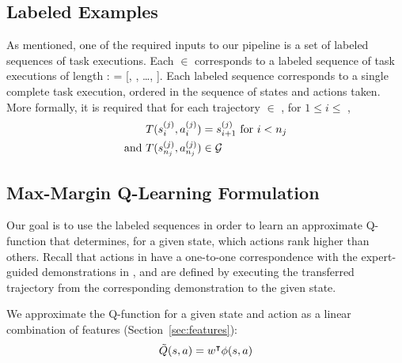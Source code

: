 \subsection{Labeled Examples}
\label{subsec:labeledex}

As mentioned, one of the required inputs to our pipeline is a set 
of labeled sequences of task executions. Each  $\in$ 
corresponds to a labeled sequence of
task executions of length :  = [,
, \ldots, ]. Each labeled sequence corresponds
to a single complete task execution, ordered in the sequence of states and
actions taken. More formally, it is required that for each trajectory
 $\in$ , for $1 \leq i \leq$ ,
\begin{align*}
T(s_{i}^{(j)}, a_{i}^{(j)}) &= s_{i+1}^{(j)} \text{ for } i < n_{j} \\
\text{and } T(s_{n_{j}}^{(j)}, a_{n_{j}}^{(j)}) &\in \mathcal{G}{}
\end{align*}

\subsection{Max-Margin Q-Learning Formulation}
Our goal is to use the labeled sequences  in order to learn an
approximate Q-function that determines, for a given state, which actions
rank higher than others.
Recall that actions in \actionset{} have a one-to-one correspondence with the
expert-guided demonstrations in \demoset{}, and are defined by executing the
transferred trajectory from the corresponding demonstration to the given state.

We approximate the Q-function for a given state \statevar{} and action
\actionvar{} as a linear combination of features \features{\statevar{}}{\actionvar{}}
(Section~\ref{sec:features}):
\begin{equation}
\tilde{Q}(s{}, a{}) = w^\intercal{} \phi({s{}}, {a{}})
\end{equation}

